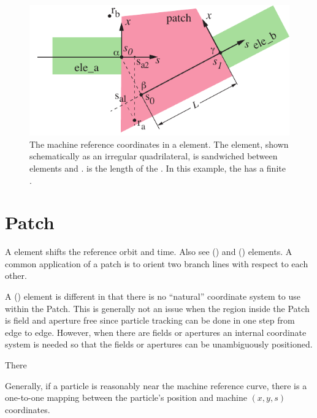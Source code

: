 \begin{figure}[bt]
  \centering
  \includegraphics[width=5in]{patch-problem.pdf}
  \caption[The machine reference coordinates in a  element.]
{The machine reference coordinates in a  element. The  element, shown
schematically as an irregular quadrilateral, is sandwiched between elements  and
.  is the length of the . In this example, the  has a finite
.}
  \label{f:patch.prob}
\end{figure}

\section{Patch}
\label{s:patch}

A  element shifts the reference orbit and time. Also see 
() and  () elements. A common application of a patch
is to orient two branch lines with respect to each other. 


A  () element is different in that there is no ``natural'' coordinate 
system to use within the Patch. This is generally not an issue when the region inside the
Patch is field and aperture free since particle tracking can be done in one step from edge
to edge. However, when there are fields or apertures an internal
coordinate system is needed so that the fields or apertures can be unambiguously positioned.



There 


Generally, if a particle is reasonably near the machine reference curve, there is a one-to-one mapping
between the particle's position and machine $(x, y, s)$ coordinates. 


